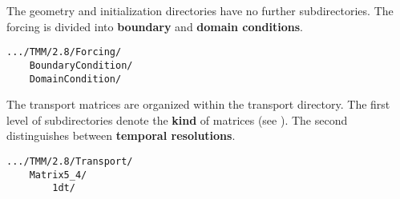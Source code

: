 \documentclass{article}
\begin{document}
The geometry and initialization directories have no further subdirectories.
The forcing is divided into \textbf{boundary} and \textbf{domain conditions}.
\begin{verbatim}
.../TMM/2.8/Forcing/
    BoundaryCondition/
    DomainCondition/
\end{verbatim}

The transport matrices are organized within the transport directory.
The first level of subdirectories denote the \textbf{kind} of matrices (see \cite{KhViCa05}).
The second distinguishes between \textbf{temporal resolutions}.
\begin{verbatim}
.../TMM/2.8/Transport/
    Matrix5_4/
        1dt/
\end{verbatim}

%
%

%

\end{document}
